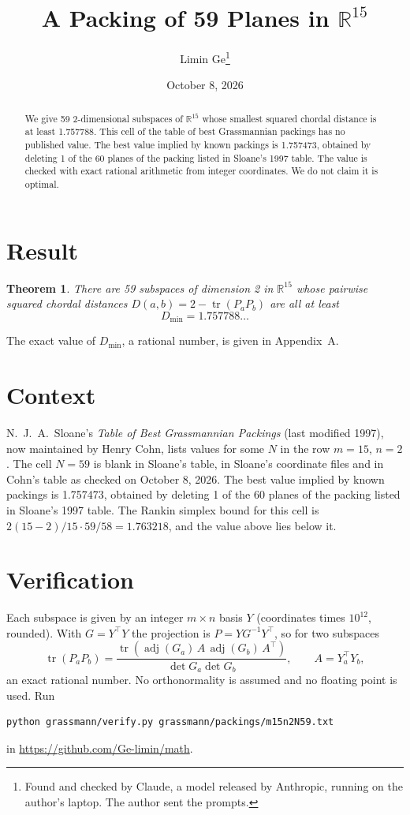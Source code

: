 \documentclass[11pt,a4paper]{article}
\title{A Packing of 59 Planes in $\mathbb{R}^{15}$}
\author{Limin Ge\thanks{Found and checked by Claude, a model released by Anthropic, running on the author's laptop. The author sent the prompts.}}
\date{October 8, 2026}
\newtheorem*{theorem}{Theorem}
\begin{document}
\maketitle
\begin{abstract}
We give 59 2-dimensional subspaces of $\mathbb{R}^{15}$ whose smallest squared chordal distance is at least 1.757788. This cell of the table of best Grassmannian packings has no published value. The best value implied by known packings is 1.757473, obtained by deleting 1 of the 60 planes of the packing listed in Sloane's 1997 table. The value is checked with exact rational arithmetic from integer coordinates. We do not claim it is optimal.
\end{abstract}

\section{Result}
\begin{theorem}
There are 59 subspaces of dimension 2 in $\mathbb{R}^{15}$ whose pairwise squared chordal distances $D(a,b) = 2 - \operatorname{tr}(P_aP_b)$ are all at least
\[ D_{\min} = 1.757788\ldots \]
\end{theorem}
The exact value of $D_{\min}$, a rational number, is given in Appendix~A.


\section{Context}
N.~J.~A.~Sloane's \emph{Table of Best Grassmannian Packings} (last modified 1997), now maintained by Henry Cohn, lists values for some $N$ in the row $m=15$, $n=2$. The cell $N=59$ is blank in Sloane's table, in Sloane's coordinate files and in Cohn's table as checked on October 8, 2026. The best value implied by known packings is 1.757473, obtained by deleting 1 of the 60 planes of the packing listed in Sloane's 1997 table. The Rankin simplex bound for this cell is $2(15-2)/15\cdot 59/58 = 1.763218$, and the value above lies below it.


\section{Verification}
Each subspace is given by an integer $m\times n$ basis $Y$ (coordinates times $10^{12}$, rounded). With $G=Y^\top Y$ the projection is $P=YG^{-1}Y^\top$, so for two subspaces
\[ \operatorname{tr}(P_aP_b)=\frac{\operatorname{tr}(\operatorname{adj}(G_a)\,A\,\operatorname{adj}(G_b)\,A^\top)}{\det G_a\det G_b},\qquad A=Y_a^\top Y_b, \]
an exact rational number. No orthonormality is assumed and no floating point is used. Run
\begin{verbatim}
python grassmann/verify.py grassmann/packings/m15n2N59.txt
\end{verbatim}
in \url{https://github.com/Ge-limin/math}.
\end{document}
